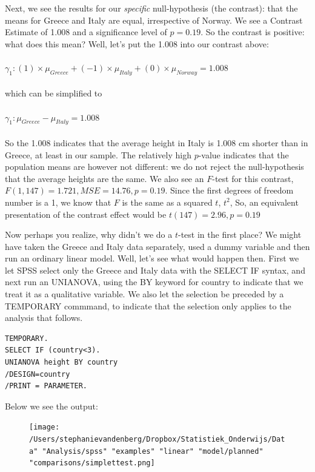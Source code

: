 \documentclass[]{report}\usepackage[]{graphicx}\usepackage[]{color}
\begin{document}
Next, we see the results for our \textit{specific} null-hypothesis (the contrast): that the means for Greece and Italy are equal, irrespective of Norway. We see a Contrast Estimate of 1.008 and a significance level of $p=0.19$. So the contrast is positive: what does this mean? Well, let's put the 1.008 into our contrast above:
\\
\\
$\gamma_1: (1)\times \mu_{Greece} + (-1) \times \mu_{Italy} + (0) \times \mu_{Norway} = 1.008$
\\
\\
which can be simplified to
\\
\\
$\gamma_1:  \mu_{Greece} - \mu_{Italy}  =  1.008$
\\
\\
So the 1.008 indicates that the average height in Italy is 1.008 cm shorter than in Greece, at least in our sample. The relatively high $p$-value indicates that the population means are however not different: we do not reject the null-hypothesis that the average heights are the same.
We also see an $F$-test for this contrast, $F(1, 147)=1.721, MSE= 14.76, p=0.19$.
Since the first degrees of freedom number is a 1, we know that $F$ is the same as a squared $t$, $t^2$, So, an equivalent presentation of the contrast effect would be $t(147)=2.96, p=0.19$

Now perhaps you realize, why didn't we do a $t$-test in the first place? We might have taken the Greece and Italy data separately, used a dummy variable and then run an ordinary linear model. Well, let's see what would happen then.
First we let SPSS select only the Greece and Italy data with the SELECT IF syntax, and next run an UNIANOVA, using the BY keyword for country to indicate that we treat it as a qualitative variable. We also let the selection be preceded by a TEMPORARY commmand, to indicate that the selection only applies to the analysis that follows.

\begin{verbatim}
TEMPORARY.
SELECT IF (country<3).
UNIANOVA height BY country
/DESIGN=country
/PRINT = PARAMETER.  
\end{verbatim}


Below we see the output:
\begin{figure}[h]
    \begin{center}
       \texttt{[image: /Users/stephanievandenberg/Dropbox/Statistiek\_Onderwijs/Data" "Analysis/spss" "examples" "linear" "model/planned" "comparisons/simplettest.png]}
    \end{center}
\end{figure}
\end{document}
